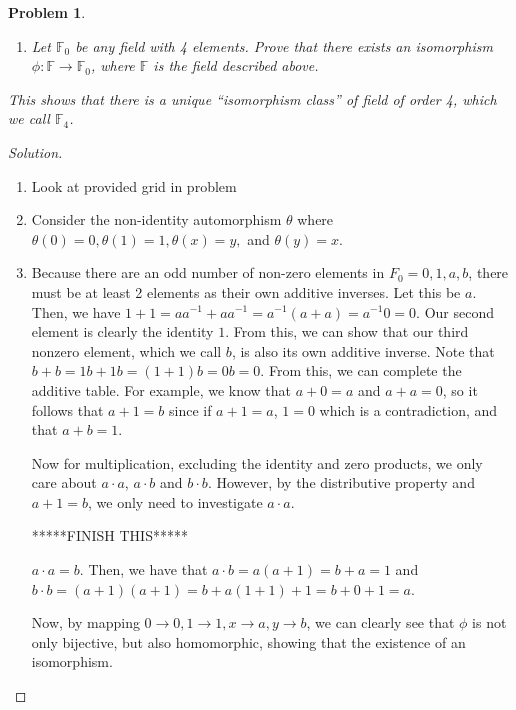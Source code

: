 \documentclass[11 pt]{article}
\newtheorem{Prob}{Problem}
\theoremstyle{definition}
\theoremstyle{remark}
\newenvironment{solution}
  {\renewcommand\qedsymbol{$\blacksquare$}\begin{proof}[Solution]}
  {\end{proof}}
\begin{document}
\begin{Prob}
\begin{enumerate}
		\item  Let $\mathbb{F}_0$ be any field with 4 elements. Prove that there exists an isomorphism $\phi : \mathbb{F} \rightarrow \mathbb{F}_0$,
		where $\mathbb{F}$ is the field described above.
		
	\end{enumerate}
This shows that there is a unique “isomorphism class” of field of order 4, which we call $\mathbb{F}_4$.

\end{Prob}

\begin{solution}
\begin{enumerate}
    \item Look at provided grid in problem
    \item Consider the non-identity automorphism $\theta$ where $\theta(0)=0, \theta(1)=1, \theta(x)=y,$ and $\theta(y)=x$.
    \item Because there are an odd number of non-zero elements in $F_0={0,1,a,b}$, there must be at least 2 elements as their own additive inverses. Let this be $a$. Then, we have
		$1+1 = aa^{-1}+aa^{-1} = a^{-1}(a+a) = a^{-1}0=0$. Our second element is clearly the identity $1$. From this, we can show that our third nonzero element, which we call $b$, is also its own additive inverse. Note that $b+b=1b+1b=(1+1)b=0b=0$. From this, we can complete the additive table. For example, we know that $a+0=a$ and $a+a=0$, so it follows that $a+1=b$ since if $a+1=a$, $1=0$ which is a contradiction, and that $a+b = 1$. 
		
		Now for multiplication, excluding the identity and zero products, we only care about $a\cdot a$, $a \cdot b$ and $b \cdot b$. However, by the distributive property and $a+1=b$, we only need to investigate $a \cdot a$.
		
		*****FINISH THIS*****
		
		$a \cdot a = b$. Then, we have that $a \cdot b = a(a+1) = b+a=1$ and $b\cdot b = (a+1)(a+1) = b + a(1+1) + 1 = b+0+1=a$. 
		
		Now, by mapping $0 \rightarrow 0, 1 \rightarrow 1, x \rightarrow a, y \rightarrow b$, we can clearly see that $\phi$ is not only bijective, but also homomorphic, showing that the existence of an isomorphism.
\end{enumerate}
\end{solution}
\end{document}
